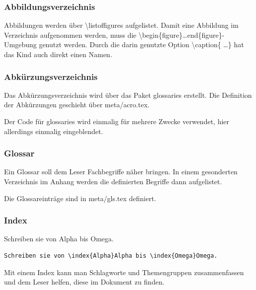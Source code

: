 \subsubsection{Abbildungsverzeichnis}
\label{sec:lof}
Abbildungen werden über \textbackslash listoffigures aufgelistet. Damit eine Abbildung im Verzeichnis aufgenommen werden, muss die \textbackslash begin\{figure\}\ldots end\{figure\}-Umgebung genutzt werden. Durch die darin genutzte Option \textbackslash caption\{ \ldots \} hat das Kind auch direkt einen Namen.

\subsubsection{Abkürzungsverzeichnis}
\label{sec:acros}
Das Abkürzungsverzeichnis wird über das Paket glossaries erstellt. Die Definition der Abkürzungen geschieht über meta/acro.tex.

Der Code für glossaries wird einmalig für mehrere Zwecke verwendet, hier allerdings einmalig eingeblendet.



\subsubsection{Glossar}
\label{sec:glossaries}
Ein Glossar soll dem Leser Fachbegriffe näher bringen. In einem gesonderten Verzeichnis im Anhang werden die definierten Begriffe dann aufgelistet.



Die Glossareinträge sind in meta/gls.tex definiert.

\subsubsection{Index}
\label{sec:xindy}
Schreiben sie von Alpha bis Omega.

\begin{lstlisting}
Schreiben sie von \index{Alpha}Alpha bis \index{Omega}Omega.
\end{lstlisting}

Mit einem Index kann man Schlagworte und Themengruppen zusammenfassen und dem Leser helfen, diese im Dokument zu finden.


